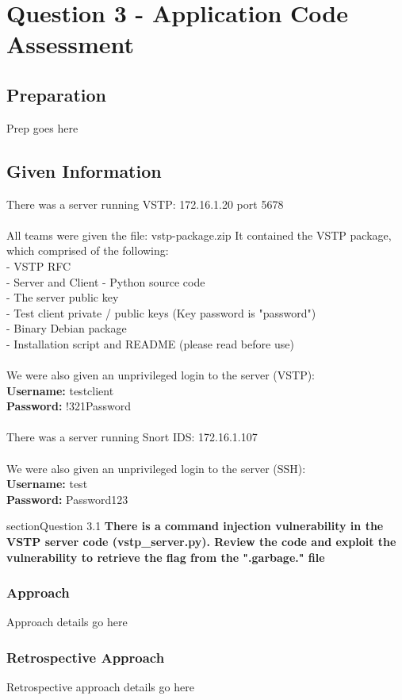 \chapter{Question 3 - Application Code Assessment}

\section{Preparation}
Prep goes here

\section{Given Information}
There was a server running VSTP: 172.16.1.20 port 5678
\\\\
All teams were given the file: vstp-package.zip
It contained the VSTP package, which comprised of the following:
\\- VSTP RFC
\\- Server and Client - Python source code
\\- The server public key
\\- Test client private / public keys (Key password is "password")
\\- Binary Debian package
\\- Installation script and README (please read before use)
\\\\
We were also given an unprivileged login to the server (VSTP):\\
\textbf{Username:} testclient
\\
\textbf{Password:} !321Password
\\\\
There was a server running Snort IDS: 172.16.1.107
\\\\
We were also given an unprivileged login to the server (SSH):\\
\textbf{Username:} test
\\
\textbf{Password:} Password123

section{Question 3.1}
\textbf{There is a command injection vulnerability in the VSTP server code
(vstp\_server.py). Review the code and exploit the vulnerability to retrieve the
flag from the ".garbage." file}
\subsection{Approach}
Approach details go here
\subsection{Retrospective Approach}
Retrospective approach details go here

